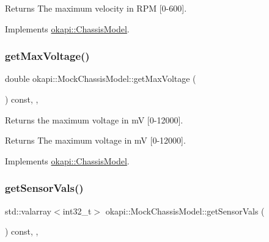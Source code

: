 \begin{DoxyReturn}{Returns}
The maximum velocity in R\+PM \mbox{[}0-\/600\mbox{]}. 
\end{DoxyReturn}


Implements \mbox{\hyperlink{classokapi_1_1ChassisModel_ab45dd7430636ed1c1dee25dae6df5d46}{okapi\+::\+Chassis\+Model}}.

\mbox{\label{classokapi_1_1MockChassisModel_a68e0317d444b60f14617acfc3e242ad1}} 
\subsubsection{\texorpdfstring{getMaxVoltage()}{getMaxVoltage()}}
{\footnotesize\ttfamily double okapi\+::\+Mock\+Chassis\+Model\+::get\+Max\+Voltage (\begin{DoxyParamCaption}{ }\end{DoxyParamCaption}) const\hspace{0.3cm}{\ttfamily [inline]}, {\ttfamily [override]}, {\ttfamily [virtual]}}



Returns the maximum voltage in mV \mbox{[}0-\/12000\mbox{]}. 

\begin{DoxyReturn}{Returns}
The maximum voltage in mV \mbox{[}0-\/12000\mbox{]}. 
\end{DoxyReturn}


Implements \mbox{\hyperlink{classokapi_1_1ChassisModel_a3ced2121524ae523592db64733c69472}{okapi\+::\+Chassis\+Model}}.

\mbox{\label{classokapi_1_1MockChassisModel_a9f380fec68c9a1b6c695989841b3f712}} 
\subsubsection{\texorpdfstring{getSensorVals()}{getSensorVals()}}
{\footnotesize\ttfamily std\+::valarray$<$int32\+\_\+t$>$ okapi\+::\+Mock\+Chassis\+Model\+::get\+Sensor\+Vals (\begin{DoxyParamCaption}{ }\end{DoxyParamCaption}) const\hspace{0.3cm}{\ttfamily [inline]}, {\ttfamily [override]}, {\ttfamily [virtual]}}



